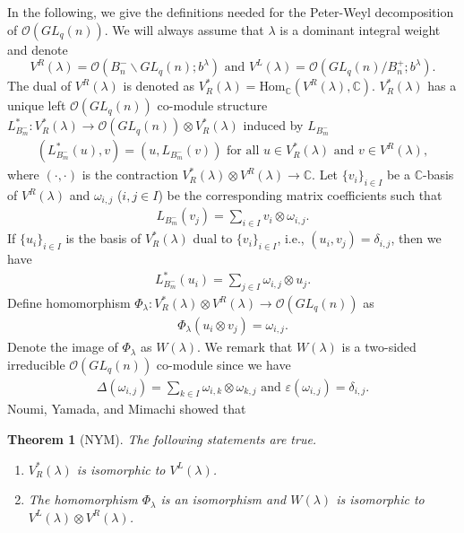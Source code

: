 \documentclass[table,a4paper,reqno]{amsart}
\numberwithin{equation}{section}
\newtheorem{theorem}{Theorem}[section]
\theoremstyle{definition}
\begin{document}
In the following, we give the definitions needed for the Peter-Weyl decomposition of $\mathcal{O}(GL_q(n))$. We will always assume that $\lambda$ is a dominant integral weight and denote
\begin{equation}\label{eq:irrep}
        V^R(\lambda)=\mathcal{O}\left(B_n^-\backslash GL_q(n);b^\lambda\right)\text{ and }V^L(\lambda)=\mathcal{O}\left( GL_q(n)/B_n^+;b^\lambda\right).
\end{equation}
The dual of $V^R(\lambda)$ is denoted as $V^{*}_R(\lambda)=\text{Hom}_\mathbb{C}(V^R(\lambda),\mathbb{C})$. $V^{*}_R(\lambda)$ has a unique left $\mathcal{O}(GL_q(n))$ co-module structure $L^*_{B_m^-}:V^{*}_R(\lambda)\rightarrow \mathcal{O}(GL_q(n))\otimes V^{*}_R(\lambda)$ induced by $L_{B_m^-}$
\begin{align}
    \left(L^*_{B_m^-}(u),v\right)=\left(u,L_{B_m^-}(v)\right)\text{ for all }u\in V^{*}_R(\lambda)\text{ and }v\in V^R(\lambda),\label{eq:2.31}
\end{align}
where $(\cdot,\cdot)$ is the contraction $V^{*}_R(\lambda)\otimes V^R(\lambda)\rightarrow \mathbb{C}$. Let $\{v_i\}_{i\in I}$ be a $\mathbb{C}$-basis of $V^R(\lambda)$ and $\omega_{i,j}$ ($i,j\in I$) be the corresponding matrix coefficients such that
\begin{align}
    L_{B_m^-}(v_j)=\sum_{i\in I}v_i\otimes\omega_{i,j}.\label{eq:2.32}
\end{align}
If $\{u_i\}_{i\in I}$ is the basis of $V^{*}_R(\lambda)$ dual to $\{v_i\}_{i\in I}$, i.e., $(u_i,v_j)=\delta_{i,j}$, then we have
\begin{align}
    L^*_{B_m^-}(u_i)=\sum_{j\in I} \omega_{i,j}\otimes u_j.\label{eq:2.33}
\end{align}
Define homomorphism $\Phi_\lambda:V^{*}_R(\lambda)\otimes V^R(\lambda)\rightarrow \mathcal{O}(GL_q(n))$ as
\begin{align}
    \Phi_\lambda(u_i\otimes v_j)=\omega_{i,j}.\label{eq:2.34}
\end{align}
Denote the image of $\Phi_\lambda$ as $W(\lambda)$. We remark that $W(\lambda)$ is a two-sided irreducible $\mathcal{O}(GL_q(n))$ co-module since we have
\begin{align}
    \Delta(\omega_{i,j})=\sum_{k\in I}\omega_{i,k}\otimes\omega_{k,j}\text{ and }\varepsilon(\omega_{i,j})=\delta_{i,j}.\label{eq:2.35}
\end{align}
Noumi, Yamada, and Mimachi showed that
\begin{theorem}[NYM]\label{thm:2.2} The following statements are true.
    \begin{enumerate}
        \item [1)] $V^{*}_R(\lambda)$ is isomorphic to $V^L(\lambda)$.
        \item[2)] The homomorphism $\Phi_\lambda$ is an isomorphism and  $W(\lambda)$ is isomorphic to $V^L(\lambda)\otimes V^R(\lambda)$.
    \end{enumerate}
\end{theorem}
\end{document}
